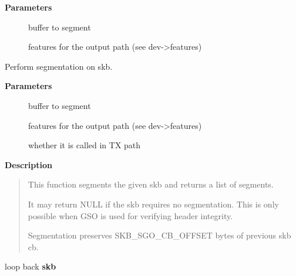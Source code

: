 \documentclass[a4paper,8pt,english]{sphinxmanual}
\begin{document}
\textbf{Parameters}
\begin{description}
\item[{}] \leavevmode
buffer to segment

\item[{}] \leavevmode
features for the output path (see dev-\textgreater{}features)

\end{description}

\begin{fulllineitems}
\label{networking/kapi:c.__skb_gso_segment}
Perform segmentation on skb.

\end{fulllineitems}


\textbf{Parameters}
\begin{description}
\item[{}] \leavevmode
buffer to segment

\item[{}] \leavevmode
features for the output path (see dev-\textgreater{}features)

\item[{}] \leavevmode
whether it is called in TX path

\end{description}

\textbf{Description}
\begin{quote}

This function segments the given skb and returns a list of segments.

It may return NULL if the skb requires no segmentation.  This is
only possible when GSO is used for verifying header integrity.

Segmentation preserves SKB\_SGO\_CB\_OFFSET bytes of previous skb cb.
\end{quote}

\begin{fulllineitems}
\label{networking/kapi:c.dev_loopback_xmit}
loop back \textbf{skb}

\end{fulllineitems}
\end{document}
